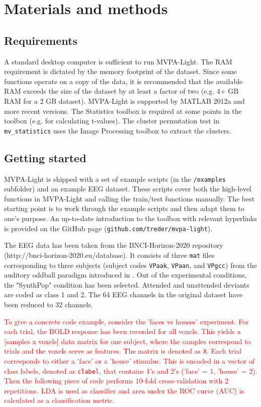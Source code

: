 \documentclass[utf8]{frontiersSCNS} %
\newcommand{\ttt}[1]{\texttt{#1}}
\newcommand{\red}[1]{\textcolor{red}{#1}}
\begin{document}
\section{Materials and methods}

\subsection{Requirements}

A standard desktop computer is sufficient to run MVPA-Light. The RAM requirement is dictated by the memory footprint of the dataset. Since some functions operate on a copy of the data, it is recommended that the available RAM exceeds the size of the dataset by at least a factor of two (e.g. 4+ GB RAM for a 2 GB dataset). MVPA-Light is supported by MATLAB 2012a and more recent versions. The Statistics toolbox is required at some points in the toolbox (e.g. for calculating t-values). The cluster permutation test in \ttt{mv\_statistics} uses the Image Processing toolbox to extract the clusters.

\subsection{Getting started}

MVPA-Light is shipped with a set of example scripts (in the \ttt{/examples} subfolder) and an example EEG dataset. These scripts cover both the high-level functions in MVPA-Light and calling the train/test functions manually. The best starting point is to work through the example scripts and then adapt them to one's purpose. An up-to-date introduction to the toolbox with relevant hyperlinks is provided on the GitHub page (\ttt{github.com/treder/mvpa-light}).

The EEG data has been taken from the BNCI-Horizon-2020 repository (http://bnci-horizon-2020.eu/database). It consists of three \ttt{mat} files corresponding to three subjects (subject codes \ttt{VPaak}, \ttt{VPaan}, and \ttt{VPgcc}) from the auditory oddball paradigm introduced in \cite{Treder2014}. Out of the experimental conditions, the "SynthPop" condition has been selected. Attended and unattended deviants are coded as class 1 and 2. The 64 EEG channels in the original dataset have been reduced to 32 channels.

\red{To give a concrete code example, consider the 'faces vs houses' experiment. For each trial, the BOLD response has been recorded for all voxels. This yields a [samples x voxels] data matrix for one subject, where the samples correspond to trials and the voxels serve as features. The matrix is denoted as \ttt{X}. Each trial corresponds to either a 'face' or a 'house' stimulus. This is encoded in a vector of class labels, denoted as \ttt{clabel}, that contains 1's and 2's ('face' = 1, 'house' = 2). Then the following piece of code performs 10-fold cross-validation with 2 repetitions. LDA is used as classifier and area under the ROC curve (AUC) is calculated as a classification metric.}
\end{document}
